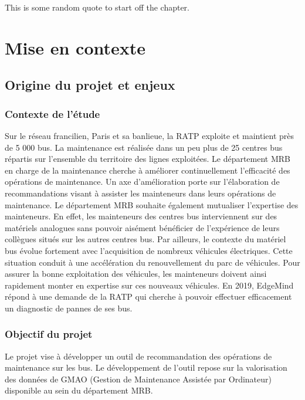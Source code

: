 \begin{savequote}[75mm] 
This is some random quote to start off the chapter.
\end{savequote}

\chapter{Mise en contexte}

\section{Origine du projet et enjeux}

\subsection{Contexte de l'étude}

Sur le réseau francilien, Paris et sa banlieue, la RATP exploite et maintient près de 5 000 bus. La maintenance est réalisée dans un peu plus de 25 centres bus répartis sur l’ensemble du territoire des lignes exploitées.
Le département MRB en charge de la maintenance cherche à améliorer continuellement l’efficacité des opérations de maintenance. Un axe d’amélioration porte sur l’élaboration de recommandations visant à assister les mainteneurs dans leurs opérations de maintenance.
Le département MRB souhaite également mutualiser l’expertise des mainteneurs. En effet, les mainteneurs des centres bus interviennent sur des matériels analogues sans pouvoir aisément bénéficier de l’expérience de leurs collègues situés sur les autres centres bus.
Par ailleurs, le contexte du matériel bus évolue fortement avec l’acquisition de nombreux véhicules électriques. Cette situation conduit à une accélération du renouvellement du parc de véhicules. Pour assurer la bonne exploitation des véhicules, les mainteneurs doivent ainsi rapidement monter en expertise sur ces nouveaux véhicules.
En 2019, EdgeMind répond à une demande de la RATP qui cherche à pouvoir effectuer efficacement un diagnostic de pannes de ses bus.


\subsection{Objectif du projet}

Le projet vise à développer un outil de recommandation des opérations de maintenance sur les bus. Le développement de l’outil repose sur la valorisation des données de GMAO (Gestion de Maintenance Assistée par Ordinateur) disponible au sein du département MRB.

